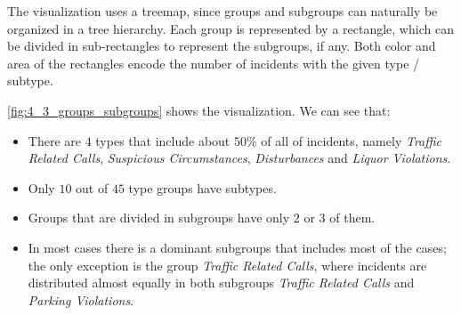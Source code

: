The visualization uses a treemap, since groups and subgroups can naturally be organized in a tree hierarchy.
Each group is represented by a rectangle, which can be divided in sub-rectangles to represent the subgroups, if any.
Both color and area of the rectangles encode the number of incidents with the given type / subtype.

\cref{fig:4_3_groups_subgroups} shows the visualization.
We can see that:
\begin{itemize}
	\item There are $4$ types that include about $50\%$ of all of incidents, namely \textit{Traffic Related Calls}, \textit{Suspicious Circumstances}, \textit{Disturbances} and \textit{Liquor Violations}.
	\item Only $10$ out of $45$ type groups have subtypes.
	\item Groups that are divided in subgroups have only $2$ or $3$ of them.
	\item In most cases there is a dominant subgroups that includes most of the cases; the only exception is the group \textit{Traffic Related Calls}, where incidents are distributed almost equally in both subgroups \textit{Traffic Related Calls} and \textit{Parking Violations}.
\end{itemize}
